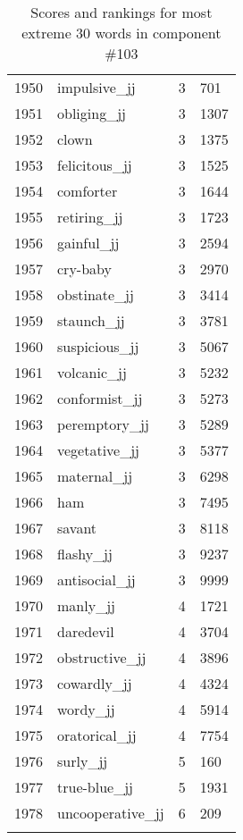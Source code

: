 \begin{longtable}[!htbp]{| rlr@{.}l |}
    1950 & impulsive\_jj & 3 & 701 \\
    1951 & obliging\_jj & 3 & 1307 \\
    1952 & clown & 3 & 1375 \\
    1953 & felicitous\_jj & 3 & 1525 \\
    1954 & comforter & 3 & 1644 \\
    1955 & retiring\_jj & 3 & 1723 \\
    1956 & gainful\_jj & 3 & 2594 \\
    1957 & cry-baby & 3 & 2970 \\
    1958 & obstinate\_jj & 3 & 3414 \\
    1959 & staunch\_jj & 3 & 3781 \\
    1960 & suspicious\_jj & 3 & 5067 \\
    1961 & volcanic\_jj & 3 & 5232 \\
    1962 & conformist\_jj & 3 & 5273 \\
    1963 & peremptory\_jj & 3 & 5289 \\
    1964 & vegetative\_jj & 3 & 5377 \\
    1965 & maternal\_jj & 3 & 6298 \\
    1966 & ham & 3 & 7495 \\
    1967 & savant & 3 & 8118 \\
    1968 & flashy\_jj & 3 & 9237 \\
    1969 & antisocial\_jj & 3 & 9999 \\
    1970 & manly\_jj & 4 & 1721 \\
    1971 & daredevil & 4 & 3704 \\
    1972 & obstructive\_jj & 4 & 3896 \\
    1973 & cowardly\_jj & 4 & 4324 \\
    1974 & wordy\_jj & 4 & 5914 \\
    1975 & oratorical\_jj & 4 & 7754 \\
    1976 & surly\_jj & 5 & 160 \\
    1977 & true-blue\_jj & 5 & 1931 \\
    1978 & uncooperative\_jj & 6 & 209 \\
    \hline
    \caption{Scores and rankings for most extreme 30 words in component \#103} \\
\end{longtable}
